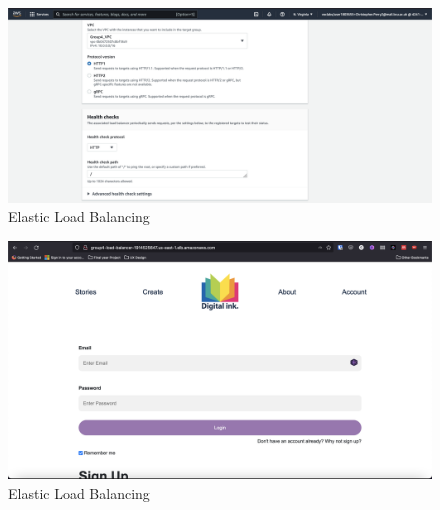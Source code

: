 \begin{figure}[!htbp]
    \centering
    \includegraphics[width=\textwidth]{resources/elb/elb-vpc.png}
    \caption{Elastic Load Balancing}
    \label{fig:elb-vpc}
\end{figure}
\begin{figure}[!htbp]
    \centering
    \includegraphics[width=\textwidth]{resources/elb/elb-working.png}
    \caption{Elastic Load Balancing}
    \label{fig:elb-working}
\end{figure}